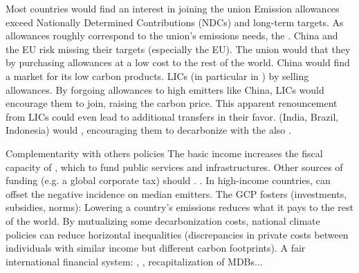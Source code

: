 \documentclass[aspectratio=169,xcolor=dvipsnames, 11pt,mathserif]{beamer}
\begin{document}
\begin{framefont}{\small}
\begin{frame}{Most countries would find an interest in joining the union}
    \bbsp \ip Emission allowances exceed Nationally Determined Contributions (NDCs) and long-term targets.
    \ip As allowances roughly correspond to the union's emissions needs, the .
    \ip China and the EU risk missing their targets (especially the EU). The union would  that they  by purchasing allowances at a low cost to the rest of the world.
    \ip China would find a market for its low carbon products. 
    \ip LICs (in particular in )  by selling allowances. By forgoing allowances to high emitters like China, LICs would encourage them to join, raising the carbon price. This apparent renouncement from LICs could even lead to additional transfers in their favor.
    \ip {} (India, Brazil, Indonesia) would , encouraging them to decarbonize with the  also .
    \ee
\end{frame}

\begin{frame}{Complementarity with others policies}
    \bbsp \ip The basic income increases the fiscal capacity of , which  to fund public services and infrastructures.
    \ip Other sources of funding (e.g. a global corporate tax) should .
    \ip {}.
    \ip In high-income countries,  can offset the negative incidence on median emitters.
    \ip The GCP fosters  (investments, subsidies, norms):
        \bbsp \ip Lowering a country's emissions reduces what it pays to the rest of the world.
        \ip By mutualizing some decarbonization costs, national climate policies can reduce horizontal inequalities (discrepancies in private costs between individuals with similar income but different carbon footprints).
        \ee
    \ip A fair international financial system: , , recapitalization of MDBs...
    \ee
\end{frame}


\end{framefont}
\end{document}
